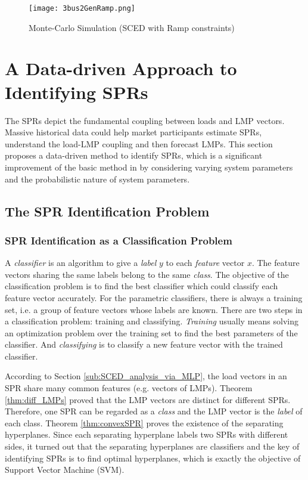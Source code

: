 \documentclass[letterpaper, 11pt]{article}
\theoremstyle{plain}
\theoremstyle{definition}
\begin{document}
\begin{figure}[htbp]
  \centering
  \texttt{[image: 3bus2GenRamp.png]}
  \caption{Monte-Carlo Simulation (SCED with Ramp constraints)}
  \label{fig:spr_ramp_mc}
\end{figure}








\section{A Data-driven Approach to Identifying SPRs} \label{sec:extended_data_driven_approach}
The SPRs depict the fundamental coupling between loads and LMP vectors. Massive historical data could help market participants estimate SPRs, understand the load-LMP coupling and then forecast LMPs. This section proposes a data-driven method to identify SPRs, which is a significant improvement of the basic method in \cite{Geng2015} by considering varying system parameters and the probabilistic nature of system parameters.

\subsection{The SPR Identification Problem} \label{sub:data_driven_approach_revisited}
\subsubsection{SPR Identification as a Classification Problem} \label{ssub:model_as_a_classification_problem}
A \emph{classifier} is an algorithm to give a \emph{label} $y$ to each \emph{feature} vector $x$. 
The feature vectors sharing the same labels belong to the same \emph{class}. The objective of the classification problem is to find the best classifier which could classify each feature vector accurately. For the parametric classifiers, there is always a training set, i.e. a group of feature vectors whose labels are known. There are two steps in a classification problem: training and classifying. \emph{Training} usually means solving an optimization problem over the training set to find the best parameters of the classifier. And \emph{classifying} is to classify a new feature vector with the trained classifier.

According to Section \ref{sub:SCED_analysis_via_MLP},  the load vectors in an SPR share many common features (e.g. vectors of LMPs). Theorem \ref{thm:diff_LMPs} proved that the LMP vectors are distinct for different SPRs. Therefore, one SPR can be regarded as a \emph{class} and the LMP vector is the \emph{label} of each class. Theorem \ref{thm:convexSPR} proves the existence of the separating hyperplanes. Since each separating hyperplane labels two SPRs with different sides, it turned out that the separating hyperplanes are classifiers and the key of identifying SPRs is to find optimal hyperplanes, which is exactly the objective of Support Vector Machine (SVM).
\end{document}
